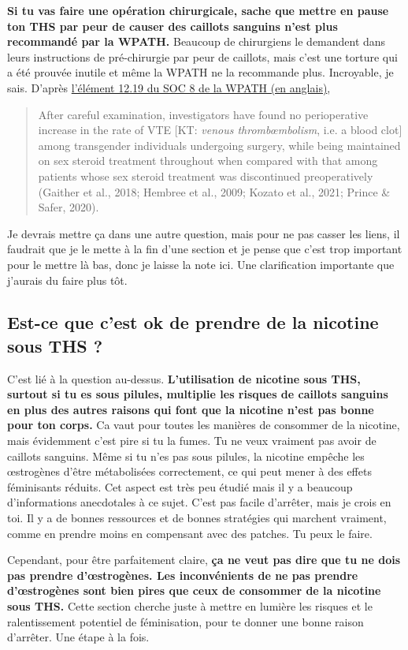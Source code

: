 \documentclass{article}
\begin{document}
\textbf{Si tu vas faire une opération chirurgicale, sache que mettre en pause ton THS par peur de causer des caillots sanguins n'est plus recommandé par la WPATH.} Beaucoup de chirurgiens le demandent dans leurs instructions de pré-chirurgie par peur de caillots, mais c'est une torture qui a été prouvée inutile et même la WPATH ne la recommande plus. Incroyable, je sais. D'après \href{https://www.tandfonline.com/doi/pdf/10.1080/26895269.2022.2100644}{l'élément 12.19 du SOC 8 de la WPATH (en anglais)}, \blockquote{After careful examination, investigators have found no perioperative increase in the rate of VTE [KT: \textit{venous thrombœmbolism}, i.e. a blood clot] among transgender individuals undergoing surgery, while being maintained on sex steroid treatment throughout when compared with that among patients whose sex steroid treatment was discontinued preoperatively (Gaither et al., 2018; Hembree et al., 2009; Kozato et al., 2021; Prince \& Safer, 2020).}. Je devrais mettre ça dans une autre question, mais pour ne pas casser les liens, il faudrait que je le mette à la fin d'une section et je pense que c'est trop important pour le mettre là bas, donc je laisse la note ici. Une clarification importante que j'aurais du faire plus tôt.

\subsection{Est-ce que c'est ok de prendre de la nicotine sous THS ?}\label{11-2}

C'est lié à la question au-dessus. \textbf{L'utilisation de nicotine sous THS, surtout si tu es sous pilules, multiplie les risques de caillots sanguins en plus des autres raisons qui font que la nicotine n'est pas bonne pour ton corps.} Ca vaut pour toutes les manières de consommer de la nicotine, mais évidemment c'est pire si tu la fumes. Tu ne veux vraiment pas avoir de caillots sanguins. Même si tu n'es pas sous pilules, la nicotine empêche les œstrogènes d'être métabolisées correctement, ce qui peut mener à des effets féminisants réduits. Cet aspect est très peu étudié mais il y a beaucoup d'informations anecdotales à ce sujet. C'est pas facile d'arrêter, mais je crois en toi. Il y a de bonnes ressources et de bonnes stratégies qui marchent vraiment, comme en prendre moins en compensant avec des patches. Tu peux le faire.

Cependant, pour être parfaitement claire, \textbf{ça ne veut pas dire que tu ne dois pas prendre d'œstrogènes. Les inconvénients de ne pas prendre d'œstrogènes sont bien pires que ceux de consommer de la nicotine sous THS.} Cette section cherche juste à mettre en lumière les risques et le ralentissement potentiel de féminisation, pour te donner une bonne raison d'arrêter. Une étape à la fois.
\end{document}
